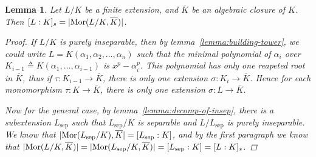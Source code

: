 \documentclass[a4paper]{article}
\DeclarePairedDelimiter{\abs}{\lvert}{\rvert}
\newcommand{\defeq}{\triangleq}
\DeclareMathOperator{\Mor}{Mor}
\newtheorem{lemma}{Lemma}
\theoremstyle{remark}
\theoremstyle{definition}
\theoremstyle{definition}
\theoremstyle{plain}
\begin{document}
  \begin{lemma}
    Let $L/K$ be a finite extension, and $\overline{K}$ be an algebraic closure of $K$.
    Then $[L: K]_s = \abs{\Mor(L/K, \overline{K})}$.

    \begin{proof}
      If $L/K$ is purely inseparable, then by lemma~\ref{lemma:building-tower}, we could write
      $L = K(\alpha_1, \alpha_2, \dots, \alpha_n)$ such that the minimal polynomial of $\alpha_i$
      over $K_{i-1} \defeq K(\alpha_1, \dots, \alpha_{i-1})$ is $x^p - \alpha_i^p$.
      This polynomial has only one reapeted root in $\overline{K}$, thus if $\tau: K_{i-1} \to \overline{K}$,
      there is only one extension $\sigma: K_i \to \overline{K}$. Hence
      for each monomorphism $\tau: K \to \overline{K}$, there is only one extension $\sigma: L \to \overline{K}$.

      Now for the general case, by lemma~\ref{lemma:decomp-of-insep}, there is a subextension
      $L_\text{sep}$ such that $L_\text{sep} / K$ is separable and $L / L_\text{sep}$ is purely inseparable.
      We know that $\abs{\Mor(L_\text{sep}/K), \overline{K}} = [L_\text{sep}: K]$, and by the
      first paragraph we know that $\abs{\Mor(L/K, \overline{K})} = \abs{\Mor(L_\text{sep}/K, \overline{K})}
      = [L_\text{sep}: K] = [L: K]_s$.
    \end{proof}
  \end{lemma}
\end{document}
